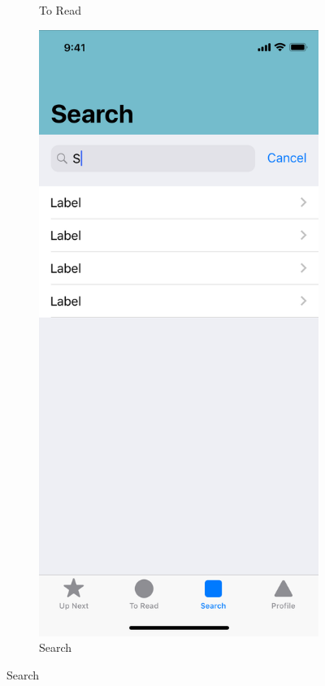 \begin{figure}[p]
\begin{subfigure}[b]{0.4\textwidth}
    \caption{To Read}
    \label{fig:1}
  \end{subfigure}
  \hfill
  \begin{subfigure}[b]{0.4\textwidth}
    \includegraphics[width=\textwidth]{img/mockups/search}
    \caption{Search}
    \label{fig:2}
  \end{subfigure}
\end{figure}


